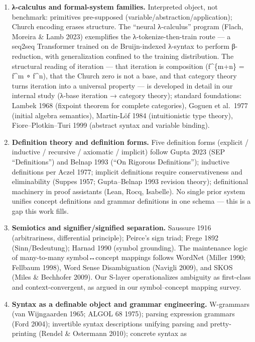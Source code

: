 \documentclass[
]{article}
\providecommand{\tightlist}{%
  \setlength{\itemsep}{0pt}\setlength{\parskip}{0pt}}
\begin{document}
\begin{enumerate}
\def\labelenumi{\arabic{enumi}.}
\tightlist
\item
  \textbf{λ-calculus and formal-system families.} Interpreted object,
  not benchmark: primitives pre-supposed
  (variable/abstraction/application); Church encoding erases structure.
  The ``neural λ-calculus'' program (Flach, Moreira \& Lamb 2023)
  exemplifies the λ-tokenize-then-train route --- a seq2seq Transformer
  trained on de Bruijn-indexed λ-syntax to perform β-reduction, with
  generalization confined to the training distribution. The structural
  reading of iteration --- that iteration is composition (f\^{}\{m+n\} =
  f\^{}m ∘ f\^{}n), that the Church zero is not a base, and that
  category theory turns iteration into a universal property --- is
  developed in detail in our internal study (λ-base iteration → category
  theory); standard foundations: Lambek 1968 (fixpoint theorem for
  complete categories), Goguen et al.~1977 (initial algebra semantics),
  Martin-Löf 1984 (intuitionistic type theory), Fiore--Plotkin--Turi
  1999 (abstract syntax and variable binding).
\item
  \textbf{Definition theory and definition forms.} Five definition forms
  (explicit / inductive / recursive / axiomatic / implicit) follow Gupta
  2023 (SEP ``Definitions'') and Belnap 1993 (``On Rigorous
  Definitions''); inductive definitions per Aczel 1977; implicit
  definitions require conservativeness and eliminability (Suppes 1957;
  Gupta--Belnap 1993 revision theory); definitional machinery in proof
  assistants (Lean, Rocq, Isabelle). No single prior system unifies
  concept definitions and grammar definitions in one schema --- this is
  a gap this work fills.
\item
  \textbf{Semiotics and signifier/signified separation.} Saussure 1916
  (arbitrariness, differential principle); Peirce's sign triad; Frege
  1892 (Sinn/Bedeutung); Harnad 1990 (symbol grounding). The maintenance
  logic of many-to-many symbol↔concept mappings follows WordNet (Miller
  1990; Fellbaum 1998), Word Sense Disambiguation (Navigli 2009), and
  SKOS (Miles \& Bechhofer 2009). Our S-layer operationalizes ambiguity
  as first-class and context-convergent, as argued in our
  symbol--concept mapping survey.
\item
  \textbf{Syntax as a definable object and grammar engineering.}
  W-grammars (van Wijngaarden 1965; ALGOL 68 1975); parsing expression
  grammars (Ford 2004); invertible syntax descriptions unifying parsing
  and pretty-printing (Rendel \& Ostermann 2010); concrete syntax as

\end{enumerate}
\end{document}
